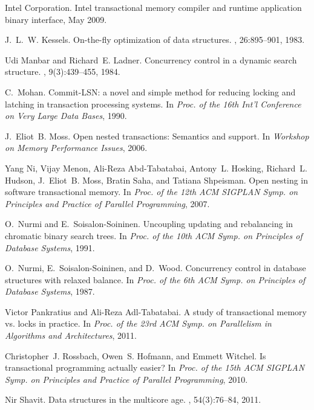 \begin{thebibliography}{99}
{
{Intel Corporation}.
\newblock Intel transactional memory compiler and runtime application binary
  interface, May 2009.

J.~L.~W. Kessels.
\newblock On-the-fly optimization of data structures.
, 26:895--901, 1983.

Udi Manbar and Richard~E. Ladner.
\newblock Concurrency control in a dynamic search structure.
, 9(3):439--455, 1984.

C.~Mohan.
\newblock Commit-{LSN}: a novel and simple method for reducing locking and
  latching in transaction processing systems.
\newblock In {\em Proc. of the 16th Int'l Conference on Very Large Data Bases},
  1990.

J.~Eliot~B. Moss.
\newblock Open nested transactions: Semantics and support.
\newblock In {\em Workshop on Memory Performance Issues}, 2006.

Yang Ni, Vijay Menon, Ali-Reza Abd-Tabatabai, Antony~L. Hosking, Richard~L.
  Hudson, J.~Eliot~B. Moss, Bratin Saha, and Tatiana Shpeisman.
\newblock Open nesting in software transactional memory.
\newblock In {\em Proc. of the 12th ACM SIGPLAN Symp. on Principles and
  Practice of Parallel Programming}, 2007.

O.~Nurmi and E.~Soisalon-Soininen.
\newblock Uncoupling updating and rebalancing in chromatic binary search trees.
\newblock In {\em Proc. of the 10th ACM Symp. on Principles of Database
  Systems}, 1991.

O.~Nurmi, E.~Soisalon-Soininen, and D.~Wood.
\newblock Concurrency control in database structures with relaxed balance.
\newblock In {\em Proc. of the 6th ACM Symp. on Principles of Database
  Systems}, 1987.

Victor Pankratius and Ali-Reza Adl-Tabatabai.
\newblock A study of transactional memory vs. locks in practice.
\newblock In {\em Proc. of the 23rd ACM Symp. on Parallelism in Algorithms and
  Architectures}, 2011.

Christopher~J. Rossbach, Owen~S. Hofmann, and Emmett Witchel.
\newblock Is transactional programming actually easier?
\newblock In {\em Proc. of the 15th ACM SIGPLAN Symp. on Principles and
  Practice of Parallel Programming}, 2010.

Nir Shavit.
\newblock Data structures in the multicore age.
, 54(3):76--84, 2011.

}
\end{thebibliography}
